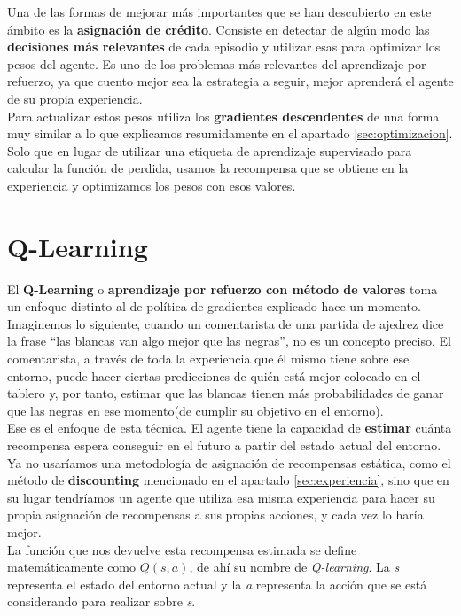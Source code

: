 \documentclass[11pt,fleqn]{book} %
\begin{document}
Una de las formas de mejorar más importantes que se han descubierto en este ámbito es la \textbf{asignación de crédito}. Consiste en detectar de algún modo las \textbf{decisiones más relevantes} de cada episodio y utilizar esas para optimizar los pesos del agente. Es uno de los problemas más relevantes del aprendizaje por refuerzo, ya que cuento mejor sea la estrategia a seguir, mejor aprenderá el agente de su propia experiencia. \\

Para actualizar estos pesos utiliza los \textbf{gradientes descendentes} de una forma muy similar a lo que explicamos resumidamente en el apartado \ref{sec:optimizacion}. Solo que en lugar de utilizar una etiqueta de aprendizaje supervisado para calcular la función de perdida, usamos la recompensa que se obtiene en la experiencia y optimizamos los pesos con esos valores. 

\section{Q-Learning}\label{sec:qlearning}

El \textbf{Q-Learning} o \textbf{aprendizaje por refuerzo con método de valores} toma un enfoque distinto al de política de gradientes explicado hace un momento. Imaginemos lo siguiente, cuando un comentarista de una partida de ajedrez dice la frase ``las blancas van algo mejor que las negras'', no es un concepto preciso. El comentarista, a través de toda la experiencia que él mismo tiene sobre ese entorno, puede hacer ciertas predicciones de quién está mejor colocado en el tablero y, por tanto, estimar que las blancas tienen más probabilidades de ganar que las negras en ese momento(de cumplir su objetivo en el entorno). \\

Ese es el enfoque de esta técnica. El agente tiene la capacidad de \textbf{estimar} cuánta recompensa espera conseguir en el futuro a partir del estado actual del entorno. Ya no usaríamos una metodología de asignación de recompensas estática, como el método de \textbf{discounting} mencionado en el apartado \ref{sec:experiencia}, sino que en su lugar tendríamos un agente que utiliza esa misma experiencia para hacer su propia asignación de recompensas a sus propias acciones, y cada vez lo haría mejor. \\

La función que nos devuelve esta recompensa estimada se define matemáticamente como $Q(s,a)$, de ahí su nombre de \textit{Q-learning}. La \textit{s} representa el estado del entorno actual y la \textit{a} representa la acción que se está considerando para realizar sobre \textit{s}. \\
\end{document}
